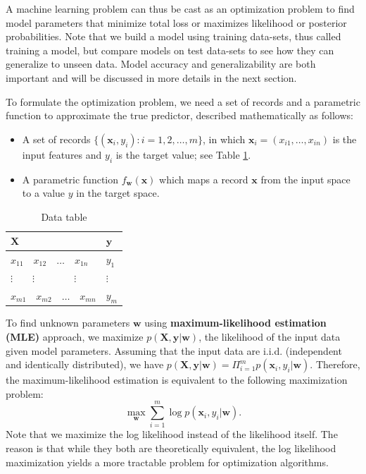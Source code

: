 \documentclass[11pt]{article}
\begin{document}
A machine learning problem can thus be cast as an optimization problem to find model parameters that minimize total loss or maximizes likelihood or posterior probabilities. Note that we build a model using training data-sets, thus called training a model, but compare models on test data-sets to see how they can generalize to unseen data. Model accuracy and generalizability are both important and will be discussed in more details in the next section.

To formulate the optimization problem, we need a set of records and a parametric function to approximate the true predictor, described mathematically as follows:
\begin{itemize}
\item A set of records \(\{(\boldsymbol{x}_i, y_i): i=1,2,\ldots,m\}\), in which \(\boldsymbol{x}_i=(x_{i1},\ldots,x_{in})\) is the input features and \(y_i\) is the target value; see Table \ref{tab:orgtable1}.
\item A parametric function \(f_{\boldsymbol{w}}(\boldsymbol{x})\) which maps a record \(\boldsymbol{x}\) from the input space to a value \(y\) in the target space.
\end{itemize}

\begin{table}[htb]
\caption{\label{tab:orgtable1}
Data table}
\centering
\begin{tabular}{ll}
\(\boldsymbol{X}\) & \(\boldsymbol{y}\)\\
\hline
\(x_{11}\quad x_{12}\quad \dots \quad x_{1n}\) & \(y_1\)\\
\(\vdots\quad\quad \vdots\qquad\qquad \vdots\) & \(\vdots\)\\
\(x_{m1}\quad x_{m2}\quad \dots \quad x_{mn}\) & \(y_m\)\\
\end{tabular}
\end{table}

To find unknown parameters \(\boldsymbol{w}\) using \textbf{maximum-likelihood estimation (MLE)} approach, we maximize \(p(\boldsymbol{X},\boldsymbol{y}|\boldsymbol{w})\), the likelihood of the input data given model parameters. Assuming that the input data are i.i.d. (independent and identically distributed), we have \(p(\boldsymbol{X},\boldsymbol{y}|\boldsymbol{w})=\Pi_{i=1}^m p(\boldsymbol{x}_i,y_i|\boldsymbol{w})\). Therefore, the maximum-likelihood estimation is equivalent to the following maximization problem:
\[
  \max_{\boldsymbol{w}} \sum_{i=1}^m \log p(\boldsymbol{x}_i,y_i|\boldsymbol{w}).
\]
Note that we maximize the log likelihood instead of the likelihood itself. The reason is that while they both are theoretically equivalent, the log likelihood maximization yields a more tractable problem for optimization algorithms. 
\end{document}
